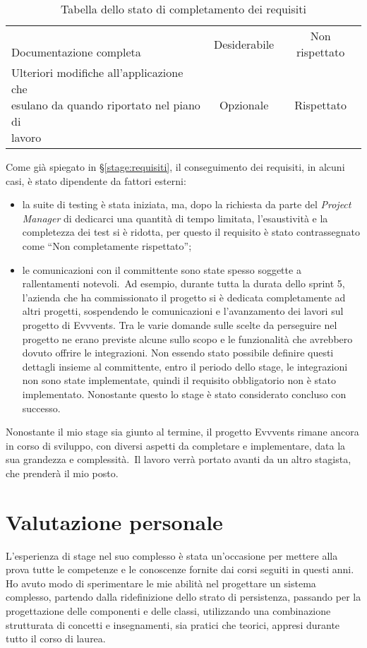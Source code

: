 \begin{table}[h]
\begin{tabularx}{\textwidth}{X|c|c}
		\makecell[l]{\vspace{-6pt} \\ Documentazione completa \\ \vspace{-6pt}} & Desiderabile & Non rispettato \\
		\makecell[l]{Ulteriori modifiche all'applicazione che \\ esulano da quando riportato nel piano di \\ lavoro} & Opzionale & Rispettato
	\end{tabularx}
	\vspace{5pt}
	\caption{Tabella dello stato di completamento dei requisiti}
\end{table}

\noindent Come già spiegato in \S \ref{stage:requisiti}, il conseguimento dei requisiti, in alcuni casi, è stato dipendente da fattori esterni:
\begin{itemize}
	\item la suite di testing è stata iniziata, ma, dopo la richiesta da parte del \emph{Project Manager} di dedicarci una quantità di tempo limitata, l'esaustività e la completezza dei test si è ridotta, per questo il requisito è stato contrassegnato come ``Non completamente rispettato'';
	\item le comunicazioni con il committente sono state spesso soggette a rallentamenti notevoli.\ Ad esempio, durante tutta la durata dello sprint 5, l'azienda che ha commissionato il progetto si è dedicata completamente ad altri progetti, sospendendo le comunicazioni e l'avanzamento dei lavori sul progetto di Evvvents. Tra le varie domande sulle scelte da perseguire nel progetto ne erano previste alcune sullo scopo e le funzionalità che avrebbero dovuto offrire le integrazioni. Non essendo stato possibile definire questi dettagli insieme al committente, entro il periodo dello stage, le integrazioni non sono state implementate, quindi il requisito obbligatorio non è stato implementato. Nonostante questo lo stage è stato considerato concluso con successo.
\end{itemize}
Nonostante il mio stage sia giunto al termine, il progetto Evvvents rimane ancora in corso di sviluppo, con diversi aspetti da completare e implementare, data la sua grandezza e complessità.\ Il lavoro verrà portato avanti da un altro stagista, che prenderà il mio posto.

\section{Valutazione personale}
L'esperienza di stage nel suo complesso è stata un'occasione per mettere alla prova tutte le competenze e le conoscenze fornite dai corsi seguiti in questi anni. Ho avuto modo di sperimentare le mie abilità nel progettare un sistema complesso, partendo dalla ridefinizione dello strato di persistenza, passando per la progettazione delle componenti e delle classi, utilizzando una combinazione strutturata di concetti e insegnamenti, sia pratici che teorici, appresi durante tutto il corso di laurea.

